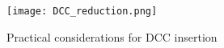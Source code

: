 \begin{figure}
    \centering
    \texttt{[image: DCC\_reduction.png]} %
    \caption{Practical considerations for DCC insertion}
    \label{fig:dccreduc}
\end{figure}
